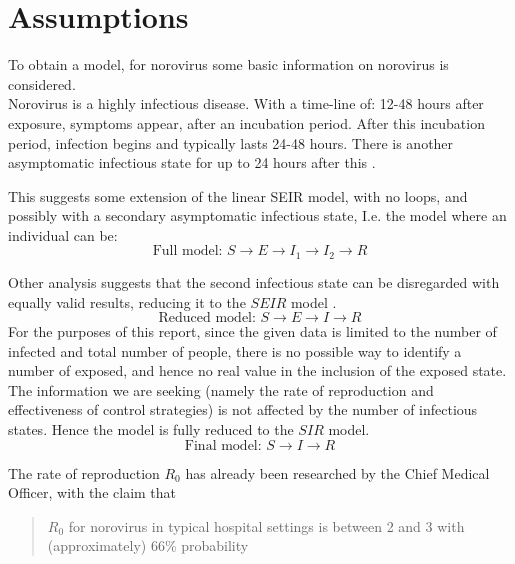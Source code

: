 \documentclass{X:/Documents/Coding/Latex/myassignment}
\begin{document}
\clearpage
\section{Assumptions}
To obtain a model, for norovirus some basic information on norovirus is considered.\\


Norovirus is a highly infectious disease. With a time-line of: 12-48 hours after exposure, symptoms appear, after an incubation period. After this incubation period, infection begins and typically lasts 24-48 hours. There is another asymptomatic infectious state for up to 24 hours after this \parencite{SAHD}.

This suggests some extension of the linear SEIR model, with no loops, and possibly with a secondary asymptomatic infectious state, I.e. the model where an individual can be:
\[\text{Full model: }S\to E\to I_1\to I_2\to R\]


Other analysis suggests that the second infectious state can be disregarded with equally valid results, reducing it to the $SEIR$ model \parencite{dynamics}. 
\[\text{Reduced model: }S\to E\to I\to R\]
For the purposes of this report, since the given data is limited to the number of infected and total number of people, there is no possible way to identify a number of exposed, and hence no real value in the inclusion of the exposed state. The information we are seeking (namely the rate of reproduction and effectiveness of control strategies) is not affected by the number of infectious states. Hence the model is fully reduced to the $SIR$ model.
\[\boxed{\text{Final model: }S\to I \to R}\]

\vspace{0.5em}

The rate of reproduction $R_0$ has already been researched by the Chief Medical Officer, with the claim that 
\begin{quote}
$R_0$ for norovirus in typical hospital settings is between 2 and 3 with (approximately) 66\% probability
\end{quote}
\end{document}
